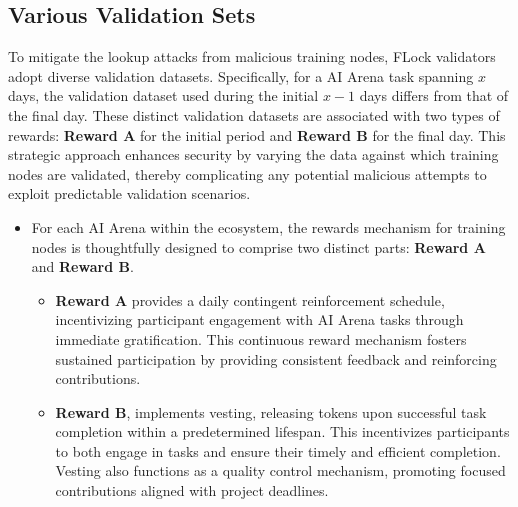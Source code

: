 \documentclass[conference]{IEEEtran}
\newcommand{\SNT}{{AI Arena}\xspace}
\begin{document}
\subsection{Various Validation Sets} To mitigate the lookup attacks from malicious training nodes, FLock validators adopt diverse validation datasets. Specifically, for a \SNT task spanning $x$ days, the validation dataset used during the initial $x-1$ days differs from that of the final day. These distinct validation datasets are associated with two types of rewards: \textbf{Reward A} for the initial period and \textbf{Reward B} for the final day. This strategic approach enhances security by varying the data against which training nodes are validated, thereby complicating any potential malicious attempts to exploit predictable validation scenarios.


\begin{itemize}
    \item For each \SNT within the ecosystem, the rewards mechanism for training nodes is thoughtfully designed to comprise two distinct parts: \textbf{Reward A} and \textbf{Reward B}.  

    \begin{itemize}
        \item \textbf{Reward A} provides a daily contingent reinforcement schedule, incentivizing participant engagement with \SNT tasks through immediate gratification. This continuous reward mechanism fosters sustained participation by providing consistent feedback and reinforcing contributions.
        \item \textbf{Reward B}, implements vesting, releasing tokens upon successful task completion within a predetermined lifespan. This incentivizes participants to both engage in tasks and ensure their timely and efficient completion. Vesting also functions as a quality control mechanism, promoting focused contributions aligned with project deadlines.
    \end{itemize}
   

\end{itemize}
\end{document}

